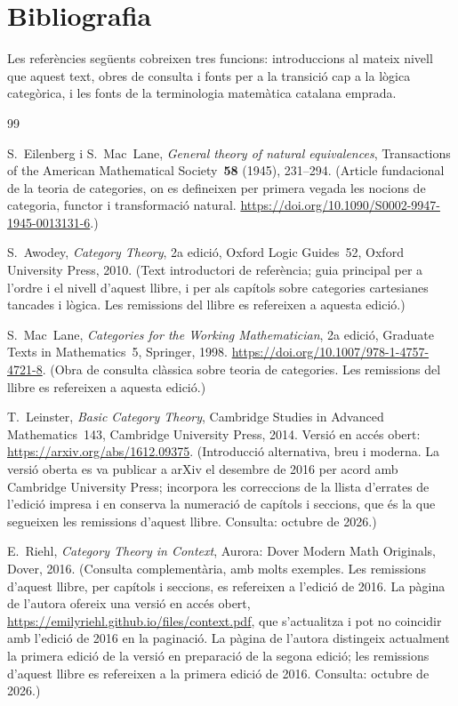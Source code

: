 \chapter*{Bibliografia}

Les referències següents cobreixen tres funcions: introduccions al mateix nivell que aquest text, obres de consulta i fonts per a la transició cap a la lògica categòrica, i les fonts de la terminologia matemàtica catalana emprada.

\begin{thebibliography}{99}

S.~Eilenberg i S.~Mac~Lane,
\emph{General theory of natural equivalences},
Transactions of the American Mathematical Society~\textbf{58} (1945), 231--294.
\newblock (Article fundacional de la teoria de categories, on es defineixen per primera vegada les nocions de categoria, functor i transformació natural. \url{https://doi.org/10.1090/S0002-9947-1945-0013131-6}.)

S.~Awodey,
\emph{Category Theory},
2a edició, Oxford Logic Guides~52, Oxford University Press, 2010.
\newblock (Text introductori de referència; guia principal per a l'ordre i el nivell d'aquest llibre, i per als capítols sobre categories cartesianes tancades i lògica. Les remissions del llibre es refereixen a aquesta edició.)

S.~Mac~Lane,
\emph{Categories for the Working Mathematician},
2a edició, Graduate Texts in Mathematics~5, Springer, 1998. \url{https://doi.org/10.1007/978-1-4757-4721-8}.
\newblock (Obra de consulta clàssica sobre teoria de categories. Les remissions del llibre es refereixen a aquesta edició.)

T.~Leinster,
\emph{Basic Category Theory},
Cambridge Studies in Advanced Mathematics~143, Cambridge University Press, 2014. Versió en accés obert: \url{https://arxiv.org/abs/1612.09375}.
\newblock (Introducció alternativa, breu i moderna. La versió oberta es va publicar a arXiv el desembre de 2016 per acord amb Cambridge University Press; incorpora les correccions de la llista d'errates de l'edició impresa i en conserva la numeració de capítols i seccions, que és la que segueixen les remissions d'aquest llibre. Consulta: octubre de 2026.)

E.~Riehl,
\emph{Category Theory in Context},
Aurora: Dover Modern Math Originals, Dover, 2016.
\newblock (Consulta complementària, amb molts exemples. Les remissions d'aquest llibre, per capítols i seccions, es refereixen a l'edició de 2016. La pàgina de l'autora ofereix una versió en accés obert, \url{https://emilyriehl.github.io/files/context.pdf}, que s'actualitza i pot no coincidir amb l'edició de 2016 en la paginació. La pàgina de l'autora distingeix actualment la primera edició de la versió en preparació de la segona edició; les remissions d'aquest llibre es refereixen a la primera edició de 2016. Consulta: octubre de 2026.)


\end{thebibliography}
